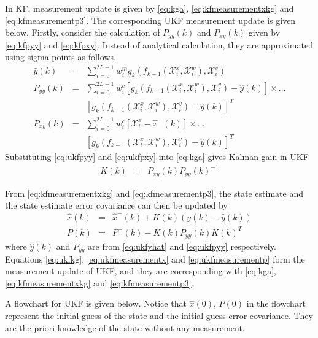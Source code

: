 In KF, measurement update is given by \eqref{eq:kga}, \eqref{eq:kfmeasurementxkg} and \eqref{eq:kfmeasurementp3}. The corresponding UKF measurement update is given below. Firstly, consider the calculation of $P_{yy}(k)$ and $P_{xy}(k)$ given by \eqref{eq:kfpyy} and \eqref{eq:kfpxy}. Instead of analytical calculation, they are approximated using sigma points as follows.
\begin{eqnarray}
	\hat{y}(k) &=& \sum_{i=0}^{2L-1} w_i^m g_k\left(f_{k-1}\left(\mathcal{X}_i^x, \mathcal{X}_i^w\right), \mathcal{X}_i^v\right) \label{eq:ukfyhat} \\
	P_{yy}(k) &=& \sum_{i=0}^{2L-1} w_i^c \left[g_k\left(f_{k-1}\left(\mathcal{X}_i^x, \mathcal{X}_i^w\right), \mathcal{X}_i^v\right) - \hat{y}(k)\right] \times \ldots \nonumber \\
	&& \left[g_k\left(f_{k-1}\left(\mathcal{X}_i^x, \mathcal{X}_i^w\right), \mathcal{X}_i^v\right) - \hat{y}(k)\right]^T \label{eq:ukfpyy} \\
	P_{xy}(k) &=& \sum_{i=0}^{2L-1} w_i^c \left[\mathcal{X}_i^x -\hat{x}^-(k)\right] \times \ldots \nonumber \\
	&& \left[g_k\left(f_{k-1}\left(\mathcal{X}_i^x, \mathcal{X}_i^w\right), \mathcal{X}_i^v\right) - \hat{y}(k)\right]^T \label{eq:ukfpxy}
\end{eqnarray}
Substituting \eqref{eq:ukfpyy} and \eqref{eq:ukfpxy} into \eqref{eq:kga} gives Kalman gain in UKF
\begin{eqnarray}
	K(k) &=& P_{xy}(k)P_{yy}(k)^{-1} \label{eq:ukfkg}
\end{eqnarray}

From \eqref{eq:kfmeasurementxkg} and \eqref{eq:kfmeasurementp3}, the state estimate and the state estimate error covariance can then be updated by
\begin{eqnarray}
	\hat{x}(k) &=& \hat{x}^-(k) + K(k)\left(y(k) - \hat{y}(k)\right) \label{eq:ukfmeasurementx} \\
	P(k) &=& P^-(k) - K(k)P_{yy}(k)K(k)^T \label{eq:ukfmeasurementp}
\end{eqnarray}
where $\hat{y}(k)$ and $P_{yy}$ are from \eqref{eq:ukfyhat} and \eqref{eq:ukfpyy} respectively. Equations \eqref{eq:ukfkg}, \eqref{eq:ukfmeasurementx} and \eqref{eq:ukfmeasurementp} form the measurement update of UKF, and they are corresponding with \eqref{eq:kga}, \eqref{eq:kfmeasurementxkg} and \eqref{eq:kfmeasurementp3}.

A flowchart for UKF is given below. Notice that $\hat{x}(0)$, $P(0)$ in the flowchart represent the initial guess of the state and the initial guess error covariance. They are the priori knowledge of the state without any measurement.

